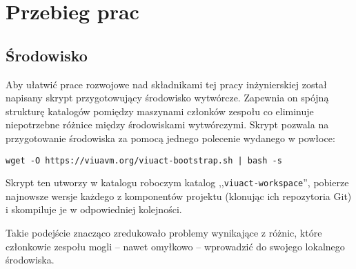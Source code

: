 \chapter{Przebieg prac}
\label{przebieg_prac}

\section*{Środowisko}

Aby ułatwić prace rozwojowe nad składnikami tej pracy inżynierskiej został napisany skrypt
przygotowujący środowisko wytwórcze. Zapewnia on spójną strukturę katalogów pomiędzy
maszynami członków zespołu co eliminuje niepotrzebne różnice między środowiskami
wytwórczymi. Skrypt pozwala na przygotowanie środowiska za pomocą jednego polecenie
wydanego w powłoce:

\begin{lstlisting}
wget -O https://viuavm.org/viuact-bootstrap.sh | bash -s
\end{lstlisting}

Skrypt ten utworzy w katalogu roboczym katalog ,,\texttt{viuact-workspace}'', pobierze
najnowsze wersje każdego z komponentów projektu (klonując ich repozytoria Git) i
skompiluje je w odpowiedniej kolejności.

Takie podejście znacząco zredukowało problemy wynikające z różnic, które członkowie
zespołu mogli -- nawet omyłkowo -- wprowadzić do swojego lokalnego środowiska.







